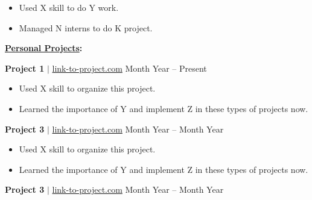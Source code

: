\documentclass[11pt]{article}
\begin{document}
    \begin{itemize}[noitemsep,nolistsep]
        \item Used X skill to do Y work.
    
        \item Managed N interns to do K project.
    \end{itemize}

\vspace{2mm}
\noindent\begin{Large}\textbf{\underline{Personal Projects}:} \end{Large}
\vspace{1mm}

    \textbf{Project 1} $\mid$ \href{https://link-to-project.com/}{link-to-project.com} \hfill Month Year – Present

    \begin{itemize}[noitemsep,nolistsep]
        \item Used X skill to organize this project.
        \item Learned the importance of Y and implement Z in these types of projects now.
    \end{itemize}
    \vspace{1mm}

    \textbf{Project 3} $\mid$ \href{https://link-to-project.com/}{link-to-project.com} \hfill Month Year – Month Year

    \begin{itemize}[noitemsep,nolistsep]
        \item Used X skill to organize this project.
        \item Learned the importance of Y and implement Z in these types of projects now.
    \end{itemize}
    \vspace{1mm}

    \textbf{Project 3} $\mid$ \href{https://link-to-project.com/}{link-to-project.com} \hfill Month Year – Month Year
\end{document}
